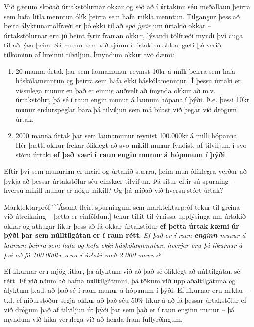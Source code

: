 \documentclass[
]{book}
\providecommand{\tightlist}{%
  \setlength{\itemsep}{0pt}\setlength{\parskip}{0pt}}
\theoremstyle{definition}
\theoremstyle{definition}
\theoremstyle{definition}
\theoremstyle{definition}
\theoremstyle{remark}
\begin{document}
Við gætum skoðað úrtakstölurnar okkar og séð að í úrtakinu séu meðallaun þeirra sem hafa litla menntun ólík þeirra sem hafa mikla menntun. Tilgangur þess að beita ályktunartölfræði er þó ekki til að \emph{spá fyrir} um úrtakið okkar -- úrtakstölurnar eru jú beint fyrir framan okkur, lýsandi tölfræði myndi því duga til að lýsa þeim. Sá munur sem við sjáum í úrtakinu okkar gæti þó verið tilkominn af hreinni tilviljun. Ímyndum okkur tvö dæmi:

\begin{enumerate}
\def\labelenumi{\arabic{enumi}.}
\tightlist
\item
  20 manna úrtak þar sem launamunur reynist 10kr á milli þeirra sem hafa háskólamenntun og þeirra sem hafa ekki háskólamenntun. Í þessu úrtaki er vissulega munur en það er einnig auðvelt að ímynda okkur að m.v. úrtakstölur, þá sé í raun engin munur á launum hópana í þýði. Þ.e. þessi 10kr munur endurspeglar bara þá tilviljun sem má búast við þegar við drögum úrtak.
\item
  2000 manna úrtak þar sem launamunur reynist 100.000kr á milli hópanna. Hér þætti okkur frekar ólíklegt að svo mikill munur fyndist, af tilviljun, í svo stóru úrtaki \textbf{ef það væri í raun engin munur á hópunum í þýði}.
\end{enumerate}

Eftir því sem munurinn er meiri og úrtakið stærra, þeim mun ólíklegra verður að þykja að þessar úrtakstölur séu einskær tilviljun. Þá situr eftir sú spurning -- hversu mikill munur er nógu mikill? Og þá miðað við hversu stórt úrtak?

Marktektarpróf \^{}{[}Ásamt fleiri spurningum sem marktektarpróf tekur til greina við útreikning -- þetta er einföldun.{]} tekur tillit til ýmissa upplýsinga um úrtakið okkar og athugar líkur þess að fá okkar úrtakstölur \textbf{ef þetta úrtak kæmi úr þýði þar sem núlltilgátan er í raun rétt. } \emph{Ef það er í raun \textbf{enginn} munur á launum þeirra sem hafa og hafa ekki háskólamenntun, hverjar eru þá líkurnar á því að fá 100.000kr mun í úrtaki með 2.000 manns?} ~

Ef líkurnar eru mjög litlar, þá ályktum við að það sé ólíklegt að núlltilgátan sé rétt. Ef við náum að hafna núlltilgátunni, þá tökum við upp aðaltilgátuna og ályktum þ.a.l. að það sé í raun munur á hópunum í þýði. Ef líkurnar eru miklar -- t.d. ef niðurstöður segja okkur að það séu 50\% líkur á að fá þessar úrtakstölur ef við drógum það af tilviljun úr þýði þar sem það er í raun enginn munur -- þá myndum við hika verulega við að henda fram fullyrðingum.
\end{document}
